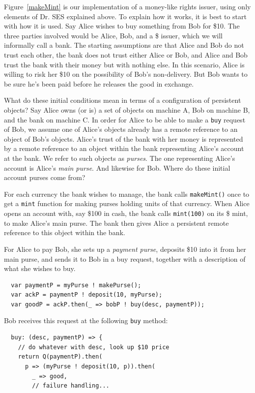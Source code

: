 \documentclass{llncs}
\begin{document}
Figure~\ref{makeMint}  is our implementation of a money-like rights issuer, using only elements of Dr. SES explained above. To explain how it works, it is best to start with how it is used. Say Alice wishes to buy something from Bob for \$10. The three parties involved would be Alice, Bob, and a \$ issuer, which we will informally call a bank. The starting assumptions are that Alice and Bob do not trust each other, the bank does not trust either Alice or Bob, and Alice and Bob trust the bank with their money but with nothing else. In this scenario, Alice is willing to risk her \$10 on the possibility of Bob's non-delivery. But Bob wants to be sure he's been paid before he releases the good in exchange.

What do these initial conditions mean in terms of a configuration of persistent objects? Say Alice owns (or is) a set of objects on machine A, Bob on machine B, and the bank on machine C. In order for Alice to be able to make a {\tt buy} request of Bob, we assume one of Alice's objects already has a remote reference to an object of Bob's objects. Alice's trust of the bank with her money is represented by a remote reference to an object within the bank representing Alice's account at the bank. We refer to such objects as \emph{purses}. The one representing Alice's account is Alice's \emph{main purse}. And likewise for Bob. Where do these initial account purses come from?

For each currency the bank wishes to manage, the bank calls {\tt makeMint()} once to get a {\tt mint} function for making purses holding units of that currency. When Alice opens an account with, say \$100 in cash, the bank calls {\tt mint(100)} on its \$ mint, to make Alice's main purse. The bank then gives Alice a persistent remote reference to this object within the bank.

For Alice to pay Bob, she sets up a \emph{payment purse}, deposits \$10 into it from her main purse, and sends it to Bob in a buy request, together with a description of what she wishes to buy.
\begin{verbatim}
  var paymentP = myPurse ! makePurse();
  var ackP = paymentP ! deposit(10, myPurse);
  var goodP = ackP.then(_ => bobP ! buy(desc, paymentP));
\end{verbatim}

Bob receives this request at the following {\tt buy} method:
\begin{verbatim}
  buy: (desc, paymentP) => {
    // do whatever with desc, look up $10 price
    return Q(paymentP).then(
      p => (myPurse ! deposit(10, p)).then(
        _ => good,
        // failure handling...
\end{verbatim}
\end{document}
